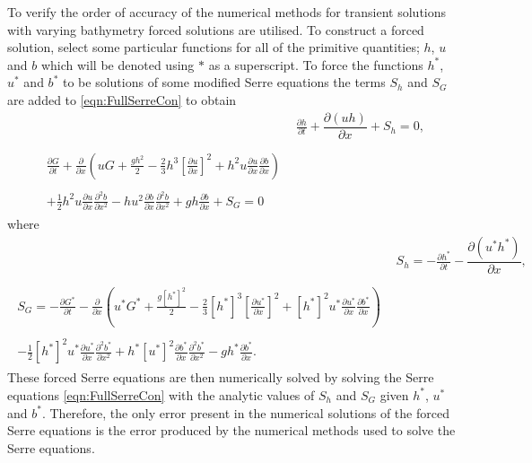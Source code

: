 To verify the order of accuracy of the numerical methods for transient solutions with varying bathymetry forced solutions are utilised. To construct a forced solution, select some particular functions for all of the primitive quantities; $h$, $u$ and $b$ which will be denoted using $*$ as a superscript. To force the functions $h^*$, $u^*$ and $b^*$ to be solutions of some modified Serre equations the terms $S_h$ and $S_G$ are added to \eqref{eqn:FullSerreCon} to obtain
\begin{subequations}
	\label{eqn:FullSerreConForced}
	\begin{align}
	& \frac{\partial h}{\partial t} + \dfrac{\partial (uh)}{\partial x} + S_{h}  = 0 ,\label{eqn:FullSerreConMassForced}  \\ \nonumber \\
	\begin{split}
	\label{eqn:SerreconsconmomForced}
	\frac{\partial G}{\partial t}  + \frac{\partial}{\partial x} \left( {u} G + \frac{gh^2}{2} - \frac{2}{3}h^3 \left[ \frac{\partial {u}}{\partial x} \right]^2 + h^2 {u}\frac{\partial {u}}{\partial x}\frac{\partial b}{\partial x} \right) \\ \\ + \frac{1}{2}h^2 {u} \frac{\partial {u}}{\partial x} \frac{\partial^2 b}{\partial x^2}  - h {u}^2\frac{\partial b}{\partial x}\frac{\partial^2 b}{\partial x^2} + gh\frac{\partial b}{\partial x} + S_{G} = 0
	\end{split}
	\end{align}
\end{subequations}
where
\begin{align*}
&  S_{h} = -\frac{\partial h^*}{\partial t} - \dfrac{\partial (u^*h^*)}{\partial x} ,  \\ \nonumber \\
\begin{split}
S_{G} = -\frac{\partial G^*}{\partial t}  - \frac{\partial}{\partial x} \left( {u}^* G^* + \frac{g\left[h^*\right]^2}{2} - \frac{2}{3}\left[h^*\right]^3 \left[\frac{\partial {u}^*}{\partial x}\right]^2 + \left[h^*\right]^2 {u^*}\frac{\partial {u}^*}{\partial x}\frac{\partial b^*}{\partial x} \right) \\ \\ - \frac{1}{2}\left[h^*\right]^2 {u}^* \frac{\partial {u}^*}{\partial x} \frac{\partial^2 b^*}{\partial x^2}  + h^* {\left[u^*\right]}^2\frac{\partial b^*}{\partial x}\frac{\partial^2 b^*}{\partial x^2} - gh^*\frac{\partial b^*}{\partial x}.
\end{split}
\end{align*} 
These forced Serre equations are then numerically solved by solving the Serre equations \eqref{eqn:FullSerreCon} with the analytic values of $S_{h}$ and $S_{G}$ given $h^*$, $u^*$ and $b^*$. Therefore, the only error present in the numerical solutions of the forced Serre equations is the error produced by the numerical methods used to solve the Serre equations.

